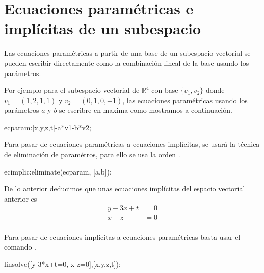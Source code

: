 
\section{Ecuaciones paramétricas e implícitas de un
subespacio}

Las ecuaciones paramétricas a partir de una base de
un subespacio vectorial se pueden escribir directamente
como la combinación lineal de la base usando los parámetros.

Por ejemplo para el subespacio vectorial de $\mathbb{R}^4$
con base $\{v_1,v_2\}$ donde
$v_1 = (1,2,1,1)$ y $v_2 = (0,1,0,-1)$, las ecuaciones
paramétricas usando los parámetros $a$ y $b$ se escribre en
maxima como mostramos a continuación.
\begin{maximai}
 ecparam:[x,y,z,t]-a*v1-b*v2;
\end{maximai}\begin{maximao}
 \left[ x-a , y-b-2\,a , z-a , t+b-a \right]
\end{maximao}

Para pasar de ecuaciones paramétricas a ecuaciones
implícitas, se usará la técnica de eliminación de
paramétros, para ello se usa la orden .
\begin{maximai}
 ecimplic:eliminate(ecparam, [a,b]);
\end{maximai}\begin{maximao}
 \left[ y-3\,x+t , x-z \right]
\end{maximao}
De lo anterior deducimos que unas ecuaciones implícitas
del espacio vectorial anterior es
\begin{align*}
 y-3x+t & = 0\\
 x-z & = 0\\
\end{align*}

Para pasar de ecuaciones implícitas a ecuaciones paramétricas
basta usar el comando .
\begin{maximai}
 linsolve([y-3*x+t=0, x-z=0],[x,y,z,t]);
\end{maximai}\begin{maximao}
 \left[ x={\it \%r}_{2} , y=3\,{\it \%r}_{2}-{\it \%r}_{1} , z=
 {\it \%r}_{2} , t={\it \%r}_{1} \right]
\end{maximao}

